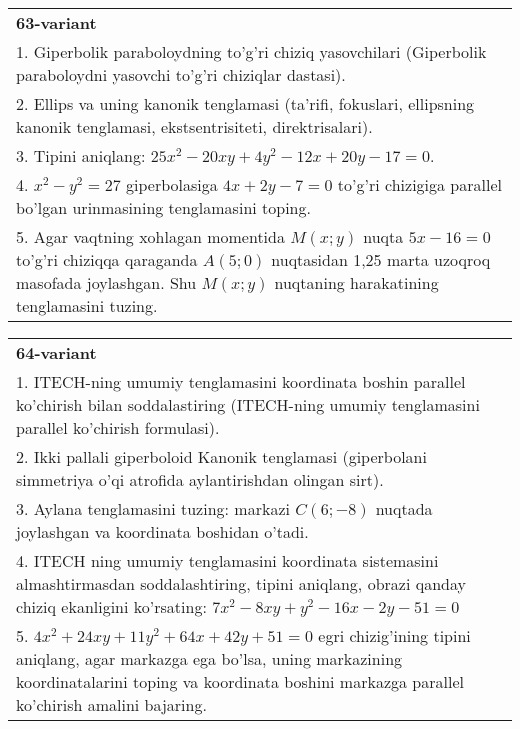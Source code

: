 \documentclass{article}
\begin{document}
\begin{tabular}{m{17cm}}
\textbf{63-variant}\\
1. Giperbolik paraboloydning to'g'ri chiziq yasovchilari (Giperbolik paraboloydni yasovchi to'g'ri chiziqlar dastasi).\\

2. Ellips va uning kanonik tenglamasi (ta'rifi, fokuslari, ellipsning kanonik tenglamasi, ekstsentrisiteti, direktrisalari).\\

3. Tipini aniqlang: $25x^{2}-20xy+4y^{2}-12x+20y-17=0$.\\

4. $x^{2} - y^{2} = 27$ giperbolasiga $4x + 2y - 7 = 0$ to'g'ri chizigiga parallel bo'lgan urinmasining tenglamasini toping.  \\

5. Agar vaqtning xohlagan momentida $M(x;y)$ nuqta $5x - 16 = 0$ to'g'ri chiziqqa qaraganda $A(5;0)$ nuqtasidan 1,25 marta uzoqroq masofada joylashgan. Shu $M(x;y)$ nuqtaning harakatining tenglamasini tuzing.  
\end{tabular}
\vspace{1cm}


\begin{tabular}{m{17cm}}
\textbf{64-variant}\\
1. ITECH-ning umumiy tenglamasini koordinata boshin parallel ko'chirish bilan soddalastiring (ITECH-ning umumiy tenglamasini parallel ko'chirish formulasi).\\

2. Ikki pallali giperboloid Kanonik tenglamasi (giperbolani simmetriya o'qi atrofida aylantirishdan olingan sirt).\\

3. Aylana tenglamasini tuzing: markazi $C(6;-8)$ nuqtada joylashgan va koordinata boshidan o'tadi.\\

4. ITECH ning umumiy tenglamasini koordinata sistemasini almashtirmasdan soddalashtiring, tipini aniqlang, obrazi qanday chiziq ekanligini ko'rsating: $7x^{2} - 8xy + y^{2} - 16x - 2y - 51 = 0$\\

5. $4x^{2} + 24xy + 11y^{2} + 64x + 42y + 51 = 0$ egri chizig'ining tipini aniqlang, agar markazga ega bo'lsa, uning markazining koordinatalarini toping va koordinata boshini markazga parallel ko'chirish amalini bajaring.
\end{tabular}
\vspace{1cm}
\end{document}
